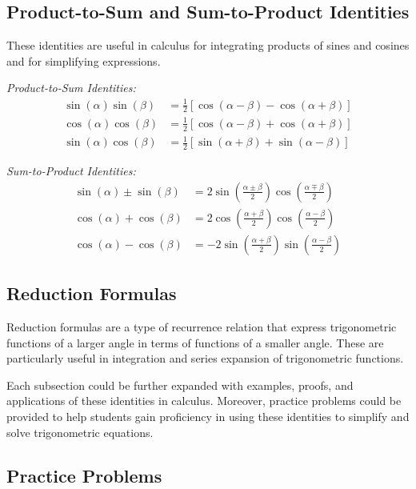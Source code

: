 \documentclass[a4paper,12pt]{book}
\newcounter{problem}
\begin{document}
\subsection{Product-to-Sum and Sum-to-Product Identities}
\label{subsec:product_sum_identities}
These identities are useful in calculus for integrating products of sines and cosines and for simplifying expressions.

\textit{Product-to-Sum Identities:}
\begin{align*}
\sin(\alpha)\sin(\beta) &= \frac{1}{2}[\cos(\alpha - \beta) - \cos(\alpha + \beta)] \\
\cos(\alpha)\cos(\beta) &= \frac{1}{2}[\cos(\alpha - \beta) + \cos(\alpha + \beta)] \\
\sin(\alpha)\cos(\beta) &= \frac{1}{2}[\sin(\alpha + \beta) + \sin(\alpha - \beta)]
\end{align*}

\textit{Sum-to-Product Identities:}
\begin{align*}
\sin(\alpha) \pm \sin(\beta) &= 2\sin\left(\frac{\alpha \pm \beta}{2}\right)\cos\left(\frac{\alpha \mp \beta}{2}\right) \\
\cos(\alpha) + \cos(\beta) &= 2\cos\left(\frac{\alpha + \beta}{2}\right)\cos\left(\frac{\alpha - \beta}{2}\right) \\
\cos(\alpha) - \cos(\beta) &= -2\sin\left(\frac{\alpha + \beta}{2}\right)\sin\left(\frac{\alpha - \beta}{2}\right)
\end{align*}

\subsection{Reduction Formulas}
\label{subsec:reduction_formulas}
Reduction formulas are a type of recurrence relation that express trigonometric functions of a larger angle in terms of functions of a smaller angle. These are particularly useful in integration and series expansion of trigonometric functions.


Each subsection could be further expanded with examples, proofs, and applications of these identities in calculus. Moreover, practice problems could be provided to help students gain proficiency in using these identities to simplify and solve trigonometric equations.

\subsection{Practice Problems}
\label{subsec:practice_problems_trig_identities}
\end{document}
